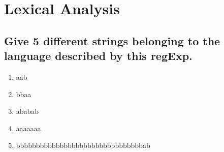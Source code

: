 \section{Lexical Analysis}      
\subsection{Give 5 different strings belonging to the language described by this regExp.}
\begin{spacing}{0.1}
\begin{enumerate}
\item aab
\item bbaa
\item ababab
\item aaaaaaa
\item bbbbbbbbbbbbbbbbbbbbbbbbbbbbbbbbab
\end{enumerate}
\end{spacing}
